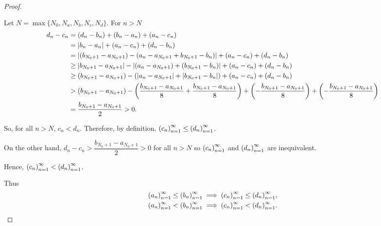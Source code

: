 \begin{proof}
\begin{enumerate}[label={\textbf{Case \arabic*.}},itemindent=0.5cm]
              Let $N = \max\{ N_{0}, N_{a}, N_{b}, N_{c}, N_{d} \}$. For $n > N$
              \begin{align*}
                  d_{n} - c_{n} & = (d_{n} - b_{n}) + (b_{n} - a_{n}) + (a_{n} - c_{n})                                                                                                                                                                          \\
                                & = \left\vert{b_{n} - a_{n}}\right\vert + (a_{n} - c_{n}) + (d_{n} - b_{n})                                                                                                                                                                      \\
                                & = \left\vert{(b_{N_{0}+1} - a_{N_{0}+1}) - (a_{n} - a_{N_{0}+1} + b_{N_{0}+1} - b_{n})}\right\vert + (a_{n} - c_{n}) + (d_{n} - b_{n})                                                                                                          \\
                                & \ge \left\vert{b_{N_{0}+1} - a_{N_{0}+1}}\right\vert - \left\vert{(a_{n} - a_{N_{0}+1}) + (b_{N_{0}+1} - b_{n})}\right\vert + (a_{n} - c_{n}) + (d_{n} - b_{n})                                                                                                  \\
                                & \ge (b_{N_{0}+1} - a_{N_{0}+1}) - \left(\left\vert{a_{n} - a_{N_{0}+1}}\right\vert + \left\vert{b_{N_{0}+1} - b_{n}}\right\vert\right) + (a_{n} - c_{n}) + (d_{n} - b_{n})                                                                                       \\
                                & > (b_{N_{0}+1} - a_{N_{0}+1}) - \left(\frac{b_{N_{0}+1} - a_{N_{0}+1}}{8} + \frac{b_{N_{0}+1} - a_{N_{0}+1}}{8}\right) + \left(-\frac{b_{N_{0}+1} - a_{N_{0}+1}}{8}\right) + \left(-\frac{b_{N_{0}+1} - a_{N_{0}+1}}{8}\right) \\
                                & = \frac{b_{N_{0}+1} - a_{N_{0}+1}}{2} > 0.
              \end{align*}

              So, for all $n > N$, $c_{n} < d_{n}$. Therefore, by definition, ${\left({c_{n}}\right)}^{\infty}_{n=1}\le {\left({d_{n}}\right)}^{\infty}_{n=1}$.

              On the other hand, $d_{n} - c_{n} > \dfrac{b_{N_{0} + 1} - a_{N_{0} + 1}}{2} > 0$ for all $n > N$ so ${\left({c_{n}}\right)}^{\infty}_{n=1}$ and ${\left({d_{n}}\right)}^{\infty}_{n=1}$ are inequivalent.
              \bigskip

              Hence, ${\left({c_{n}}\right)}^{\infty}_{n=1} < {\left({d_{n}}\right)}^{\infty}_{n=1}$.
    \end{enumerate}

    \bigskip
    Thus
    \begin{align*}
        {\left({a_{n}}\right)}^{\infty}_{n=1} \le {\left({b_{n}}\right)}^{\infty}_{n=1} \implies {\left({c_{n}}\right)}^{\infty}_{n=1} \le {\left({d_{n}}\right)}^{\infty}_{n=1}, \\
        {\left({a_{n}}\right)}^{\infty}_{n=1} < {\left({b_{n}}\right)}^{\infty}_{n=1} \implies {\left({c_{n}}\right)}^{\infty}_{n=1} < {\left({d_{n}}\right)}^{\infty}_{n=1}.
    \end{align*}
\end{proof}

